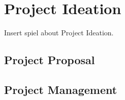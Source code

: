 \chapter{Project Ideation}


Insert spiel about Project Ideation.

\section{Project Proposal}


\section{Project Management}


